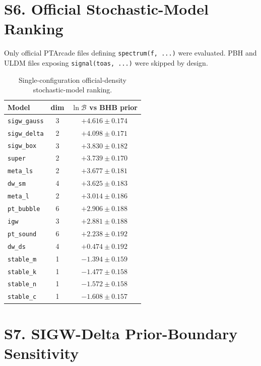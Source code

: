 \documentclass[aps,prl,superscriptaddress,nofootinbib]{revtex4-2}
\begin{document}
\section*{S6. Official Stochastic-Model Ranking}

Only official PTArcade files defining \texttt{spectrum(f, ...)} were evaluated.
PBH and ULDM files exposing \texttt{signal(toas, ...)} were skipped by design.

\begin{table}[H]
\caption{\label{tab:rank}Single-configuration official-density stochastic-model ranking.}
\begin{ruledtabular}
\begin{tabular}{lcc}
Model & dim & $\ln\mathcal{B}$ vs BHB prior \\
\hline
\texttt{sigw\_gauss} & 3 & $+4.616\pm0.174$ \\
\texttt{sigw\_delta} & 2 & $+4.098\pm0.171$ \\
\texttt{sigw\_box} & 3 & $+3.830\pm0.182$ \\
\texttt{super} & 2 & $+3.739\pm0.170$ \\
\texttt{meta\_ls} & 2 & $+3.677\pm0.181$ \\
\texttt{dw\_sm} & 4 & $+3.625\pm0.183$ \\
\texttt{meta\_l} & 2 & $+3.014\pm0.186$ \\
\texttt{pt\_bubble} & 6 & $+2.906\pm0.188$ \\
\texttt{igw} & 3 & $+2.881\pm0.188$ \\
\texttt{pt\_sound} & 6 & $+2.238\pm0.192$ \\
\texttt{dw\_ds} & 4 & $+0.474\pm0.192$ \\
\texttt{stable\_m} & 1 & $-1.394\pm0.159$ \\
\texttt{stable\_k} & 1 & $-1.477\pm0.158$ \\
\texttt{stable\_n} & 1 & $-1.572\pm0.158$ \\
\texttt{stable\_c} & 1 & $-1.608\pm0.157$ \\
\end{tabular}
\end{ruledtabular}
\end{table}

\section*{S7. SIGW-Delta Prior-Boundary Sensitivity}
\end{document}

